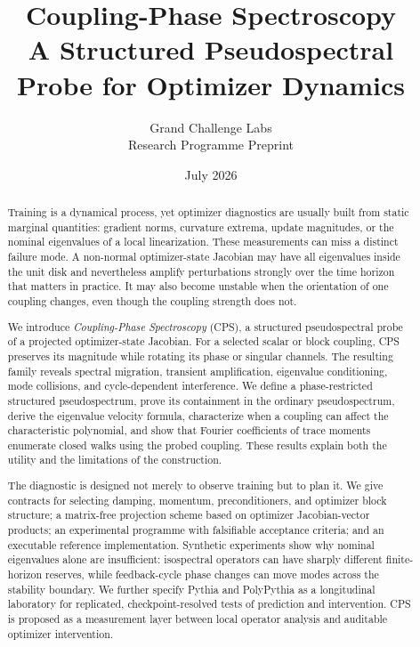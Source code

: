 \documentclass[11pt]{article}
\title{\vspace{-1.5em}\textbf{Coupling-Phase Spectroscopy}\\[0.35em]
\large A Structured Pseudospectral Probe for Optimizer Dynamics}
\author{Grand Challenge Labs\\
\small Research Programme Preprint}
\date{July 2026}
\theoremstyle{definition}
\theoremstyle{remark}
\newcommand{\cps}{\textsc{CPS}}
\begin{document}
\maketitle

\begin{abstract}
Training is a dynamical process, yet optimizer diagnostics are usually built from static marginal quantities: gradient norms, curvature extrema, update magnitudes, or the nominal eigenvalues of a local linearization.  These measurements can miss a distinct failure mode.  A non-normal optimizer-state Jacobian may have all eigenvalues inside the unit disk and nevertheless amplify perturbations strongly over the time horizon that matters in practice.  It may also become unstable when the orientation of one coupling changes, even though the coupling strength does not.

We introduce \emph{Coupling-Phase Spectroscopy} (\cps), a structured pseudospectral probe of a projected optimizer-state Jacobian.  For a selected scalar or block coupling, \cps{} preserves its magnitude while rotating its phase or singular channels.  The resulting family reveals spectral migration, transient amplification, eigenvalue conditioning, mode collisions, and cycle-dependent interference.  We define a phase-restricted structured pseudospectrum, prove its containment in the ordinary pseudospectrum, derive the eigenvalue velocity formula, characterize when a coupling can affect the characteristic polynomial, and show that Fourier coefficients of trace moments enumerate closed walks using the probed coupling.  These results explain both the utility and the limitations of the construction.

The diagnostic is designed not merely to observe training but to plan it.  We give contracts for selecting damping, momentum, preconditioners, and optimizer block structure; a matrix-free projection scheme based on optimizer Jacobian-vector products; an experimental programme with falsifiable acceptance criteria; and an executable reference implementation.  Synthetic experiments show why nominal eigenvalues alone are insufficient: isospectral operators can have sharply different finite-horizon reserves, while feedback-cycle phase changes can move modes across the stability boundary.  We further specify Pythia and PolyPythia as a longitudinal laboratory for replicated, checkpoint-resolved tests of prediction and intervention.  \cps{} is proposed as a measurement layer between local operator analysis and auditable optimizer intervention.
\end{abstract}
\end{document}
